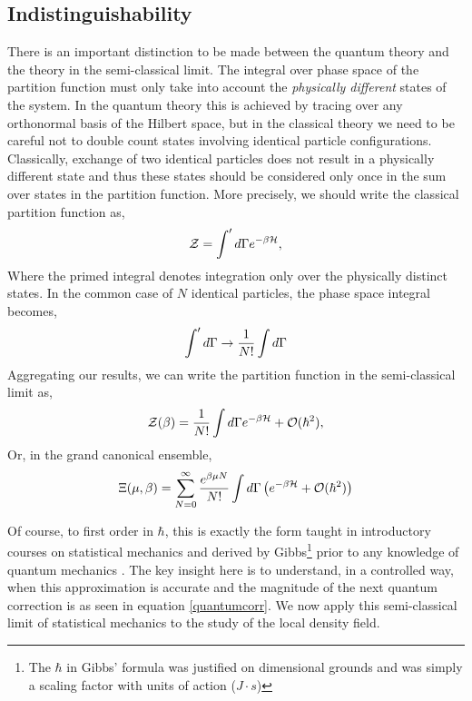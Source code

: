 \subsection{Indistinguishability} %

There is an important distinction to be made between the quantum theory and the
theory in the semi-classical limit.  The integral over phase space of the
partition function must only take into account the \textit{physically
different} states of the system.  In the quantum theory this is achieved by
tracing over any orthonormal basis of the Hilbert space, but in the classical
theory we need to be careful not to double count states involving identical
particle configurations. Classically, exchange of two identical particles does
not result in a physically different state and thus these states should be
considered only once in the sum over states in the partition function.  More
precisely, we should write the classical partition function as,
%
\begin{equation}
    \mathcal{Z} = \int^\prime d\Gamma e^{-\beta \mathcal{H}}, 
\end{equation}
%
Where the primed integral denotes integration only over the physically distinct
states. In the common case of $N$ identical particles, the phase space integral
becomes, 
%
\begin{equation}
    \int^\prime d\Gamma \rightarrow \frac{1}{N!}\int d\Gamma
\end{equation}
%
Aggregating our results, we can write the partition function in the
semi-classical limit as,
%
\begin{equation}
    \mathcal{Z}(\beta) = \frac{1}{N!}\int d\Gamma e^{-\beta \mathcal{H}} + \mathcal{O}(\hbar ^ 2),
\end{equation}
%
Or, in the grand canonical ensemble,
%
\begin{equation} 
    \Xi(\mu, \beta) = \sum_{N = 0}^\infty \frac{e^{\beta\mu N}}{N!}
        \int d\Gamma \left( e^{-\beta \mathcal{H}} + \mathcal{O}(\hbar^2)\right)
\end{equation}

Of course, to first order in $\hbar$, this is exactly the form taught in
introductory courses on statistical mechanics and derived by Gibbs\footnote{The
$\hbar$ in Gibbs' formula was justified on dimensional grounds and was simply a
scaling factor with units of action ($J\cdot s$)} prior to any knowledge of
quantum mechanics \cite{Gibbs}. The key insight here is to understand, in a
controlled way, when this approximation is accurate and the magnitude of the next
quantum correction is as seen in equation \ref{quantumcorr}. We now apply this
semi-classical limit of statistical mechanics to the study of the local density
field.

